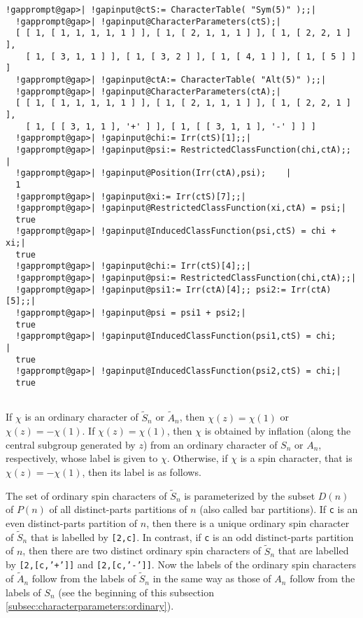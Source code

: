 \documentclass[a4paper,11pt]{report}
\begin{document}
{{{\begin{Verbatim}[commandchars=!@|,fontsize=\small,frame=single,label=Example]
  !gapprompt@gap>| !gapinput@ctS:= CharacterTable( "Sym(5)" );;|
  !gapprompt@gap>| !gapinput@CharacterParameters(ctS);|
  [ [ 1, [ 1, 1, 1, 1, 1 ] ], [ 1, [ 2, 1, 1, 1 ] ], [ 1, [ 2, 2, 1 ] ], 
    [ 1, [ 3, 1, 1 ] ], [ 1, [ 3, 2 ] ], [ 1, [ 4, 1 ] ], [ 1, [ 5 ] ] ]
  !gapprompt@gap>| !gapinput@ctA:= CharacterTable( "Alt(5)" );;|
  !gapprompt@gap>| !gapinput@CharacterParameters(ctA);|
  [ [ 1, [ 1, 1, 1, 1, 1 ] ], [ 1, [ 2, 1, 1, 1 ] ], [ 1, [ 2, 2, 1 ] ], 
    [ 1, [ [ 3, 1, 1 ], '+' ] ], [ 1, [ [ 3, 1, 1 ], '-' ] ] ]
  !gapprompt@gap>| !gapinput@chi:= Irr(ctS)[1];;|
  !gapprompt@gap>| !gapinput@psi:= RestrictedClassFunction(chi,ctA);;           |
  !gapprompt@gap>| !gapinput@Position(Irr(ctA),psi);    |
  1
  !gapprompt@gap>| !gapinput@xi:= Irr(ctS)[7];;|
  !gapprompt@gap>| !gapinput@RestrictedClassFunction(xi,ctA) = psi;|
  true
  !gapprompt@gap>| !gapinput@InducedClassFunction(psi,ctS) = chi + xi;|
  true
  !gapprompt@gap>| !gapinput@chi:= Irr(ctS)[4];;|
  !gapprompt@gap>| !gapinput@psi:= RestrictedClassFunction(chi,ctA);;|
  !gapprompt@gap>| !gapinput@psi1:= Irr(ctA)[4];; psi2:= Irr(ctA)[5];;|
  !gapprompt@gap>| !gapinput@psi = psi1 + psi2;|
  true
  !gapprompt@gap>| !gapinput@InducedClassFunction(psi1,ctS) = chi;              |
  true
  !gapprompt@gap>| !gapinput@InducedClassFunction(psi2,ctS) = chi;|
  true
  
\end{Verbatim}
 If $\chi$ is an ordinary character of  $\tilde{S}_n$ or  $\tilde{A}_n$, then $\chi(z)=\chi(1)$ or $\chi(z)=-\chi(1)$. If $\chi(z)=\chi(1)$, then $\chi$ is obtained by inflation (along the central subgroup generated by $z$) from an ordinary character of $S_n$ or $A_n$, respectively, whose label is given to $\chi$. Otherwise, if $\chi$ is a spin character, that is $\chi(z)=-\chi(1)$, then its label is as follows. 

 The set of ordinary spin characters of  $\tilde{S}_n$ is parameterized by the subset $D(n)$ of $P(n)$ of all distinct-parts partitions of $n$ (also called bar partitions). If \texttt{c} is an even distinct-parts partition of $n$, then there is a unique ordinary spin character of  $\tilde{S}_n$ that is labelled by \texttt{[2,c]}. In contrast, if \texttt{c} is an odd distinct-parts partition of $n$, then there are two distinct ordinary spin characters of  $\tilde{S}_n$ that are labelled by \texttt{[2,[c,'+']]} and \texttt{[2,[c,'-']]}. Now the labels of the ordinary spin characters of  $\tilde{A}_n$ follow from the labels of  $\tilde{S}_n$ in the same way as those of $A_n$  follow from the labels of $S_n$  (see the beginning of this subsection \ref{subsec:characterparameters:ordinary}). 
\begin{Verbatim}[commandchars=!@|,fontsize=\small,frame=single,label=Example]
  

\end{Verbatim}}}}
\end{document}
